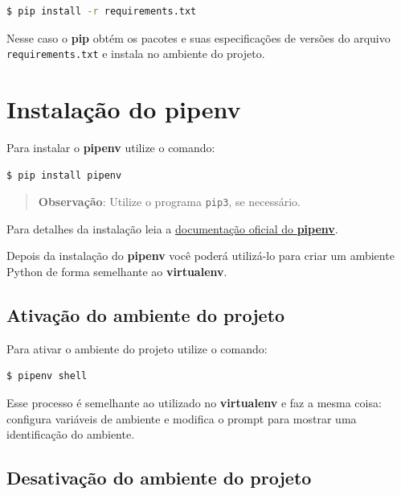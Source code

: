 \documentclass[brazil,a4paper,oneside,openright,parskip=full]{book}
\newcommand{\passthrough}[1]{#1}
\begin{document}
\begin{lstlisting}[language=sh, style=nonumber]
$ pip install -r requirements.txt
\end{lstlisting}

Nesse caso o \textbf{pip} obtém os pacotes e suas especificações de
versões do arquivo \passthrough{\lstinline!requirements.txt!} e instala
no ambiente do projeto.

\hypertarget{instalauxe7uxe3o-do-pipenv}{%
\section{Instalação do pipenv}\label{instalauxe7uxe3o-do-pipenv}}

Para instalar o \textbf{pipenv} utilize o comando:

\begin{lstlisting}[language=sh, style=nonumber]
$ pip install pipenv
\end{lstlisting}

\begin{quote}
\textbf{Observação}: Utilize o programa \passthrough{\lstinline!pip3!},
se necessário.
\end{quote}

Para detalhes da instalação leia a
\href{https://docs.pipenv.org/}{documentação oficial do
\textbf{pipenv}}.

Depois da instalação do \textbf{pipenv} você poderá utilizá-lo para
criar um ambiente Python de forma semelhante ao \textbf{virtualenv}.

\hypertarget{ativauxe7uxe3o-do-ambiente-do-projeto}{%
\subsection{Ativação do ambiente do
projeto}\label{ativauxe7uxe3o-do-ambiente-do-projeto}}

Para ativar o ambiente do projeto utilize o comando:

\begin{lstlisting}[language=sh, style=nonumber]
$ pipenv shell
\end{lstlisting}

Esse processo é semelhante ao utilizado no \textbf{virtualenv} e faz a
mesma coisa: configura variáveis de ambiente e modifica o prompt para
mostrar uma identificação do ambiente.

\hypertarget{desativauxe7uxe3o-do-ambiente-do-projeto-1}{%
\subsection{Desativação do ambiente do
projeto}\label{desativauxe7uxe3o-do-ambiente-do-projeto-1}}
\end{document}
